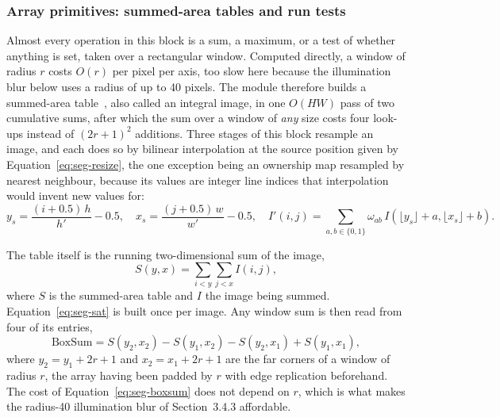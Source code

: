\subsubsection{Array primitives: summed-area tables and run tests}

Almost every operation in this block is a sum, a maximum, or a test of whether anything is set, taken over a rectangular window. Computed directly, a window of radius $r$ costs $O(r)$ per pixel per axis, too slow here because the illumination blur below uses a radius of up to 40 pixels. The module therefore builds a summed-area table~\cite{crow1984}, also called an integral image, in one $O(HW)$ pass of two cumulative sums, after which the sum over a window of \emph{any} size costs four look-ups instead of $(2r+1)^2$ additions. Three stages of this block resample an image, and each does so by bilinear interpolation at the source position given by Equation~\ref{eq:seg-resize}, the one exception being an ownership map resampled by nearest neighbour, because its values are integer line indices that interpolation would invent new values for:
\begin{equation}
y_s=\frac{(i+0.5)\,h}{h'}-0.5,\quad x_s=\frac{(j+0.5)\,w}{w'}-0.5,\quad I'(i,j)=\sum_{a,b\in\{0,1\}}\omega_{ab}\,I(\lfloor y_s\rfloor+a,\lfloor x_s\rfloor+b).
\label{eq:seg-resize}
\end{equation}

The table itself is the running two-dimensional sum of the image,
\begin{equation}
S(y,x)=\sum_{i<y}\sum_{j<x} I(i,j),
\label{eq:seg-sat}
\end{equation}
where $S$ is the summed-area table and $I$ the image being summed. Equation~\ref{eq:seg-sat} is built once per image. Any window sum is then read from four of its entries,
\begin{equation}
\mathrm{BoxSum}=S(y_2,x_2)-S(y_1,x_2)-S(y_2,x_1)+S(y_1,x_1),
\label{eq:seg-boxsum}
\end{equation}
where $y_2=y_1+2r+1$ and $x_2=x_1+2r+1$ are the far corners of a window of radius $r$, the array having been padded by $r$ with edge replication beforehand. The cost of Equation~\ref{eq:seg-boxsum} does not depend on $r$, which is what makes the radius-40 illumination blur of Section~3.4.3 affordable.

